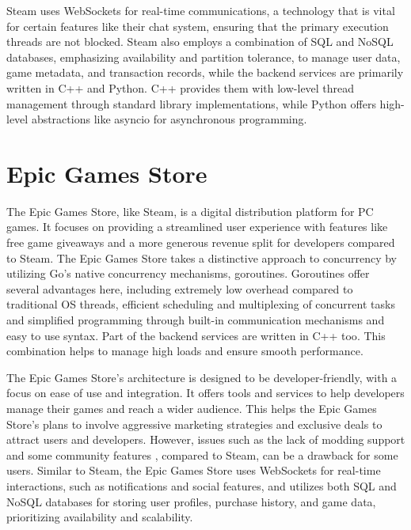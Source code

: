 \documentclass[]{final}
\begin{document}
Steam uses WebSockets for real-time communications, a technology that is vital
for certain features like their chat system, ensuring that the primary execution threads are not blocked.\cite{noauthor_isteamnetworkingsockets_nodate}
Steam also employs a combination of SQL and NoSQL databases\cite{simmons_decoding_2023, djundik_how_2017}, emphasizing availability
and partition tolerance, to manage user data, game metadata, and transaction records, while
the backend services are primarily written in C++ and Python.\cite{simmons_decoding_2023}  C++ provides them with low-level thread management through standard
library implementations, while Python offers high-level abstractions like asyncio
for asynchronous programming.

\section{Epic Games Store}
The Epic Games Store, like Steam, is a digital distribution platform for
PC games. It focuses on providing a streamlined user experience with features
like free game giveaways and a more generous revenue split for developers
compared to Steam. The Epic Games Store takes a distinctive approach to concurrency by utilizing
Go's native concurrency mechanisms, goroutines\cite{epic_games_jobs}. Goroutines offer several
advantages here, including extremely low overhead compared to traditional OS threads,
efficient scheduling and multiplexing of concurrent tasks and simplified
programming through built-in communication mechanisms and easy to use syntax.
Part of the backend services are written in C++ too\cite{epic_games_jobs}. This combination
helps to manage high loads and ensure smooth performance.

The Epic Games Store's architecture is designed to be developer-friendly, with a
focus on ease of use and integration. It offers tools and services to help
developers manage their games and reach a wider audience. This helps the Epic Games
Store's plans to involve aggressive marketing strategies and exclusive
deals to attract users and developers. However, issues such as the lack of modding support and
some community features \cite{epic_games_dev_update}, compared to Steam, can be a drawback for some users.
Similar to Steam, the Epic Games Store uses WebSockets for real-time interactions,
such as notifications and social features, and utilizes both SQL and NoSQL
databases for storing user profiles, purchase history, and game data,
\cite{spring_epic_2016, epic_games_jobs} prioritizing availability and scalability.
\end{document}
